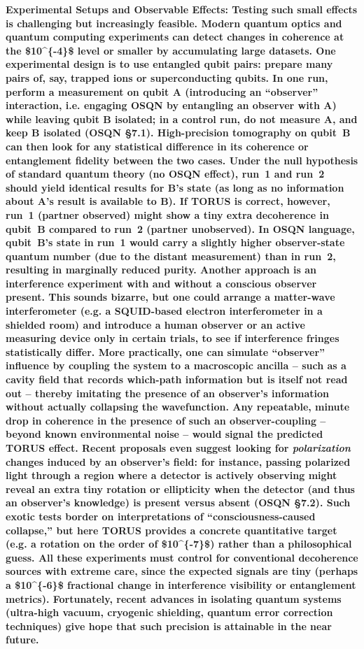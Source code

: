 \documentclass[]{article}
\begin{document}
\textbf{Experimental Setups and Observable Effects: Testing such small
effects is challenging but increasingly feasible. Modern quantum optics
and quantum computing experiments can detect changes in coherence at the
\$10\^{}\{-4\}\$ level or smaller by accumulating large datasets. One
experimental design is to use entangled qubit pairs: prepare many pairs
of, say, trapped ions or superconducting qubits. In one run, perform a
measurement on qubit A (introducing an ``observer'' interaction, i.e.
engaging OSQN by entangling an observer with A) while leaving qubit B
isolated; in a control run, do not measure A, and keep B isolated (OSQN
§7.1). High-precision tomography on qubit~B can then look for any
statistical difference in its coherence or entanglement fidelity between
the two cases. Under the null hypothesis of standard quantum theory (no
OSQN effect), run~1 and run~2 should yield identical results for B's
state (as long as no information about A's result is available to B). If
TORUS is correct, however, run~1 (partner observed) might show a tiny
extra decoherence in qubit~B compared to run~2 (partner unobserved). In
OSQN language, qubit~B's state in run~1 would carry a slightly higher
observer-state quantum number (due to the distant measurement) than in
run~2, resulting in marginally reduced purity. Another approach is an
interference experiment with and without a conscious observer present.
This sounds bizarre, but one could arrange a matter-wave interferometer
(e.g. a SQUID-based electron interferometer in a shielded room) and
introduce a human observer or an active measuring device only in certain
trials, to see if interference fringes statistically differ. More
practically, one can simulate ``observer'' influence by coupling the
system to a macroscopic ancilla -- such as a cavity field that records
which-path information but is itself not read out -- thereby imitating
the presence of an observer's information without actually collapsing
the wavefunction. Any repeatable, minute drop in coherence in the
presence of such an observer-coupling -- beyond known environmental
noise -- would signal the predicted TORUS effect. Recent proposals even
suggest looking for \emph{polarization} changes induced by an observer's
field: for instance, passing polarized light through a region where a
detector is actively observing might reveal an extra tiny rotation or
ellipticity when the detector (and thus an observer's knowledge) is
present versus absent (OSQN §7.2). Such exotic tests border on
interpretations of ``consciousness-caused collapse,'' but here TORUS
provides a concrete quantitative target (e.g. a rotation on the order of
\$10\^{}\{-7\}\$) rather than a philosophical guess. All these
experiments must control for conventional decoherence sources with
extreme care, since the expected signals are tiny (perhaps a
\$10\^{}\{-6\}\$ fractional change in interference visibility or
entanglement metrics). Fortunately, recent advances in isolating quantum
systems (ultra-high vacuum, cryogenic shielding, quantum error
correction techniques) give hope that such precision is attainable in
the near future.}
\end{document}
